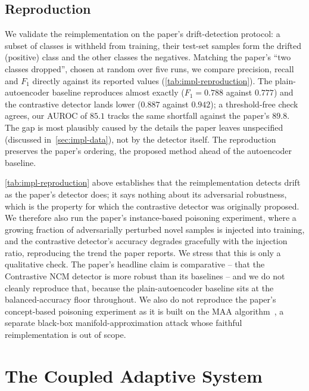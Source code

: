\subsection{Reproduction}
\label{sec:impl-repro-results}
We validate the reimplementation on the paper's drift-detection protocol: a subset of classes is withheld from training, their test-set samples form the drifted (positive) class and the other classes the negatives. Matching the paper's ``two classes dropped'', chosen at random over five runs, we compare precision, recall and $F_1$ directly against its reported values (\cref{tab:impl-reproduction}). The plain-autoencoder baseline reproduces almost exactly ($F_1 = 0.788$ against $0.777$) and the contrastive detector lands lower ($0.887$ against $0.942$); a threshold-free check agrees, our AUROC of $85.1$ tracks the same shortfall against the paper's $89.8$. The gap is most plausibly caused by the details the paper leaves unspecified (discussed in~\cref{sec:impl-data}), not by the detector itself. The reproduction preserves the paper's ordering, the proposed method ahead of the autoencoder baseline.



\cref{tab:impl-reproduction} above establishes that the reimplementation detects drift as the paper's detector does; it says nothing about its adversarial robustness, which is the property for which the contrastive detector was originally proposed. We therefore also run the paper's instance-based poisoning experiment, where a growing fraction of adversarially perturbed novel samples is injected into training, and the contrastive detector's accuracy degrades gracefully with the injection ratio, reproducing the trend the paper reports. We stress that this is only a qualitative check. The paper's headline claim is comparative -- that the Contrastive NCM detector is more robust than its baselines -- and we do not cleanly reproduce that, because the plain-autoencoder baseline sits at the balanced-accuracy floor throughout. We also do not reproduce the paper's concept-based poisoning experiment as it is built on the MAA algorithm~\cite{Kuppa_2019}, a separate black-box manifold-approximation attack whose faithful reimplementation is out of scope.

\section{The Coupled Adaptive System}
\label{sec:impl-coupled}

